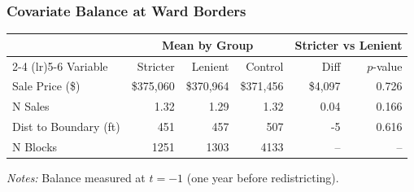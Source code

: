 \begin{frame}[label=price-balance]
    \frametitle{Covariate Balance at Ward Borders}
    \begin{center}
    \scriptsize
    \begin{threeparttable}
    \begin{tabular}{lrrrrr}
    \toprule
     & \multicolumn{3}{c}{Mean by Group} & \multicolumn{2}{c}{Stricter vs Lenient} \\
    \cmidrule(lr){2-4} \cmidrule(lr){5-6}
    Variable & Stricter & Lenient & Control & Diff & $p$-value \\
    \midrule
    Sale Price (\$) & \$375,060 & \$370,964 & \$371,456 & \$4,097 & 0.726 \\
    N Sales & 1.32 & 1.29 & 1.32 & 0.04 & 0.166 \\
    Dist to Boundary (ft) & 451 & 457 & 507 & -5 & 0.616 \\
    N Blocks & 1251 & 1303 & 4133 & -- & -- \\
    \bottomrule
    \end{tabular}
    \begin{tablenotes}
    \tiny
    \item \textit{Notes:} Balance measured at $t = -1$ (one year before redistricting).
    \end{tablenotes}
    \end{threeparttable}
    \end{center}
    \vfill\hfill \hyperlink{price-main}{}
\end{frame}
